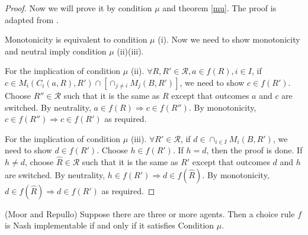\begin{proof}

  Now we will prove it by condition $\mu$ and theorem \ref{mu}. The proof is adapted from
  \parencite{Repullo90}.  

Monotonicity is equivalent to condition $\mu$ (i). Now we need to show
monotonicity and neutral imply
condition $\mu$ (ii)(iii).

For the implication of condition $\mu$ (ii). $\forall R, R' \in
\mathscr{R}, a \in f(R), i \in I$, if $c \in M_i(C_i(a, R), R') \cap [ \cap_{j
  \not = i} M_j(B, R')]$, we need to show $c \in f(R')$. Choose $R''
\in \mathscr{R}$ such that it is the same as $R$ except that outcomes
$a$ and $c$ are switched. By neutrality, $a \in f(R) \Rightarrow c \in
f(R'')$. By monotonicity, $c \in f(R'')  \Rightarrow c \in f(R')$ as
required.

For the implication of condition $\mu$ (iii). $\forall R' \in
\mathscr{R}$, if $ d \in \cap_{i \in I}M_i(B, R')$, we need to show $d
\in f(R')$. Choose $h \in f(R')$. If $h = d$, then the proof is done. 
If $h \not = d$, choose $\hat{R}
\in \mathscr{R}$ such that it is the same as $R'$ except that outcomes
$d$ and $h$ are switched. By neutrality, $h \in f(R') \Rightarrow d
\in f(\hat{R})$. By monotonicity, $d \in f(\hat{R}) \Rightarrow d \in
f(R')$ as required.
\end{proof}

\begin{thm*}(Moor and Repullo)
\label{mu}
  Suppose there are three or more agents. Then a choice rule $f$ is Nash implementable if and only if it satisfies Condition $\mu$.
\end{thm*}

